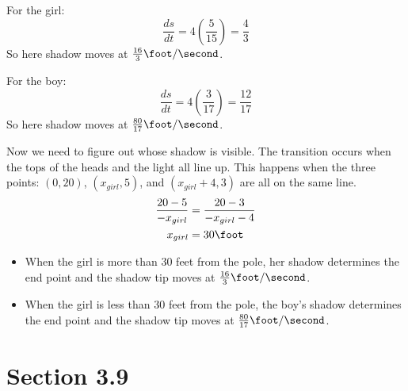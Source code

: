 \documentclass[fleqn]{exam}
\begin{document}
\begin{description}
For the girl:
\[
  \frac{ds}{dt} = 4 \left( \frac{5}{15} \right) = \frac{4}{3}
\]
So here shadow moves at $\frac{16}{3} \foot / \second$.

For the boy:
\[
  \frac{ds}{dt} = 4 \left( \frac{3}{17} \right) = \frac{12}{17}
\]
So here shadow moves at $\frac{80}{17} \foot / \second$.

Now we need to figure out whose shadow is visible.  The transition occurs when the tops of the heads and the light all
line up.  This happens when the three points: $(0, 20)$, $(x_{girl}, 5)$, and $(x_{girl} + 4, 3)$ are all on the same
line. 
\begin{align*}
  \frac{20 - 5}{-x_{girl}} &= \frac{20 - 3}{-x_{girl} - 4} \\
  x_{girl} &= 30 \foot \\
\end{align*}

\begin{itemize}
\item When the girl is more than 30 feet from the pole, her shadow determines the end point and the shadow tip moves at
$\frac{16}{3} \foot / \second$.

\item When the girl is less than 30 feet from the pole, the boy's shadow determines the end point and the shadow tip moves at
$\frac{80}{17} \foot / \second$.

\end{itemize}

 

\end{description}

\ifprintanswers

\section{Section 3.9}
\end{document}
